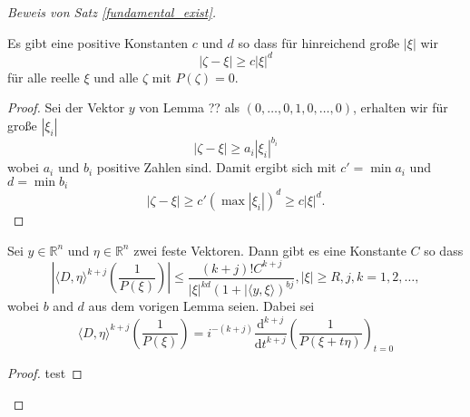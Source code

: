 \begin{proof}[Beweis von Satz \ref{fundamental_exist}]
\begin{lem}
Es gibt eine positive Konstanten $c$ und $d$ so dass für hinreichend große $|\xi|$ wir 
\begin{equation}
|\zeta- \xi|\ge c |\xi|^{d}
\end{equation} 
für alle reelle $\xi$ und alle $\zeta$ mit $P(\zeta)=0$.
\end{lem} 
\begin{proof}
Sei der Vektor $y$ von Lemma ?? als $(0,\ldots, 0, 1, 0, \ldots, 0)$, erhalten wir für große $|\xi_i|$
\begin{equation}
|\zeta-\xi|\ge a_i |\xi_i|^{b_i}
\end{equation}
wobei $a_i$ und $b_i$ positive Zahlen sind. Damit ergibt sich mit $c'=\min a_i$ und $d=\min b_i$ 
\begin{equation}
|\zeta - \xi|\ge c'(\max |\xi_i|)^d \ge c |\xi|^d.
\end{equation}
\end{proof}
\begin{lem}
Sei $y\in \mathbb R^n$ und $\eta \in \mathbb R^n$ zwei feste Vektoren. Dann gibt es eine Konstante $C$ so dass
\begin{equation}
\left | \langle D, \eta \rangle^{k+j} \left ( \frac{1}{P(\xi)} \right )  \right | \le \frac{(k+j)! C^{k+j}}{|\xi|^{kd} ( 1+ |\langle y,\xi\rangle )^{bj}}, |\xi|\ge R, j, k=1,2,\ldots,
\end{equation}
wobei $b$ and $d$ aus dem vorigen Lemma seien. Dabei sei
\begin{equation}
\langle D, \eta\rangle^{k+j} \left (\frac{1}{P(\xi)} \right ) = i^{-(k+j)} \frac{\mathrm d^{k+j}}{\mathrm d t^{k+j}} \left ( \frac{1}{P(\xi+ t\eta)} \right )_{t=0}
\end{equation}
\end{lem}
\begin{proof}
test
\end{proof}
\end{proof}
